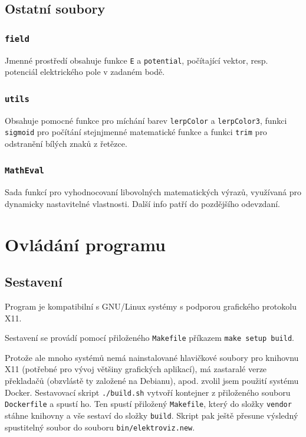 \documentclass[12pt]{article}
\newcommand{\code}[1]{\mbox{\texttt{#1}}}
\begin{document}
\subsection{Ostatní soubory}

\subsubsection{\code{field}}

Jmenné prostředí obsahuje funkce \code{E} a \code{potential}, počítající vektor,
resp. potenciál elektrického pole v zadaném bodě.

\subsubsection{\code{utils}}

Obsahuje pomocné funkce pro míchání barev \code{lerpColor} a \code{lerpColor3},
funkci \code{sigmoid} pro počítání stejnjmenné matematické funkce a funkci
\code{trim} pro odstranění bílých znaků z řetězce.

\subsubsection{\code{MathEval}}

Sada funkcí pro vyhodnocovaní libovolných matematických výrazů, využívaná pro
dynamicky nastavitelné vlastnosti. Další info patří do pozdějšího odevzdaní.

\section{Ovládání programu}

\subsection{Sestavení}

Program je kompatibilní s GNU/Linux systémy s podporou grafického protokolu X11.

Sestavení se provádí pomocí přiloženého \code{Makefile} příkazem \code{make
setup build}.

Protože ale mnoho systémů nemá nainstalované hlavičkové soubory pro knihovnu X11
(potřebné pro vývoj většiny grafických aplikací), má zastaralé verze překladačů
(obzvlástě ty založené na Debianu), apod. zvolil jsem použití systému Docker.
Sestavovací skript \code{./build.sh} vytvoří kontejner z přiloženého souboru
\code{Dockerfile} a spustí ho. Ten spustí přiložený \code{Makefile}, který do
složky \code{vendor} stáhne knihovny a vše sestaví do složky \code{build}.
Skript pak ještě přesune výsledný spustitelný soubor do souboru
\code{bin/elektroviz.new}.
\end{document}
